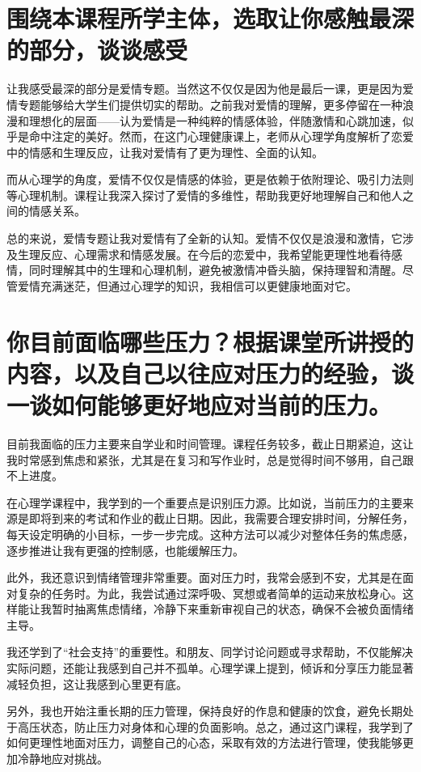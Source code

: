 \documentclass{ctexart}
\begin{document}
\section{围绕本课程所学主体，选取让你感触最深的部分，谈谈感受}
让我感受最深的部分是爱情专题。当然这不仅仅是因为他是最后一课，更是因为爱情专题能够给大学生们提供切实的帮助。之前我对爱情的理解，更多停留在一种浪漫和理想化的层面——认为爱情是一种纯粹的情感体验，伴随激情和心跳加速，似乎是命中注定的美好。然而，在这门心理健康课上，老师从心理学角度解析了恋爱中的情感和生理反应，让我对爱情有了更为理性、全面的认知。\par
而从心理学的角度，爱情不仅仅是情感的体验，更是依赖于依附理论、吸引力法则等心理机制。课程让我深入探讨了爱情的多维性，帮助我更好地理解自己和他人之间的情感关系。\par
总的来说，爱情专题让我对爱情有了全新的认知。爱情不仅仅是浪漫和激情，它涉及生理反应、心理需求和情感发展。在今后的恋爱中，我希望能更理性地看待感情，同时理解其中的生理和心理机制，避免被激情冲昏头脑，保持理智和清醒。尽管爱情充满迷茫，但通过心理学的知识，我相信可以更健康地面对它。

\section{你目前面临哪些压力？根据课堂所讲授的内容，以及自己以往应对压力的经验，谈一谈如何能够更好地应对当前的压力。}
目前我面临的压力主要来自学业和时间管理。课程任务较多，截止日期紧迫，这让我时常感到焦虑和紧张，尤其是在复习和写作业时，总是觉得时间不够用，自己跟不上进度。\par
在心理学课程中，我学到的一个重要点是识别压力源。比如说，当前压力的主要来源是即将到来的考试和作业的截止日期。因此，我需要合理安排时间，分解任务，每天设定明确的小目标，一步一步完成。这种方法可以减少对整体任务的焦虑感，逐步推进让我有更强的控制感，也能缓解压力。\par
此外，我还意识到情绪管理非常重要。面对压力时，我常会感到不安，尤其是在面对复杂的任务时。为此，我尝试通过深呼吸、冥想或者简单的运动来放松身心。这样能让我暂时抽离焦虑情绪，冷静下来重新审视自己的状态，确保不会被负面情绪主导。\par
我还学到了“社会支持”的重要性。和朋友、同学讨论问题或寻求帮助，不仅能解决实际问题，还能让我感到自己并不孤单。心理学课上提到，倾诉和分享压力能显著减轻负担，这让我感到心里更有底。\par
另外，我也开始注重长期的压力管理，保持良好的作息和健康的饮食，避免长期处于高压状态，防止压力对身体和心理的负面影响。总之，通过这门课程，我学到了如何更理性地面对压力，调整自己的心态，采取有效的方法进行管理，使我能够更加冷静地应对挑战。\par
\end{document}
